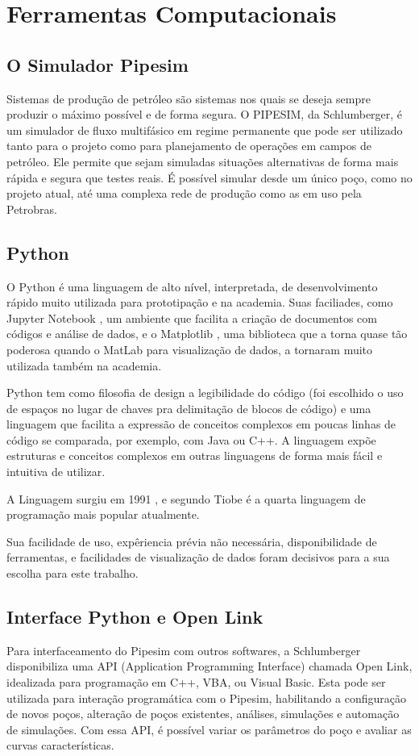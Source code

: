 
\chapter{Ferramentas Computacionais} \label{chap:4}


\section{O Simulador Pipesim}
Sistemas de produção de petróleo são sistemas nos quais se deseja sempre produzir o máximo possível e de forma segura.
O PIPESIM, da Schlumberger, é um simulador de fluxo multifásico em regime permanente que pode ser utilizado tanto para o projeto como para planejamento de operações em campos de petróleo. Ele permite que sejam simuladas situações alternativas de forma mais rápida e segura que testes reais. É possível simular desde um único poço, como no projeto atual, até uma complexa rede de produção como as em uso pela Petrobras.

\section{Python}

O Python é uma linguagem de alto nível, interpretada, de desenvolvimento rápido muito utilizada para prototipação e na academia. Suas faciliades, como Jupyter Notebook \cite{jupyter}, um ambiente que facilita a criação de documentos com códigos e análise de dados, e o Matplotlib \cite{matplotlib}, uma biblioteca que a torna quase tão poderosa quando o MatLab para visualização de dados, a tornaram muito utilizada também na academia.

Python tem como filosofia de design a legibilidade do código (foi escolhido o uso de espaços no lugar de chaves pra delimitação de blocos de código) e uma linguagem que facilita a expressão de conceitos complexos em poucas linhas de código se comparada, por exemplo, com Java ou C++. A linguagem expõe estruturas e conceitos complexos em outras linguagens de forma mais fácil e intuitiva de utilizar.

A Linguagem surgiu em 1991 \cite{pythonHistory}, e segundo Tiobe \cite{tiobe} é a quarta linguagem de programação mais popular atualmente.

Sua facilidade de uso, expêriencia prévia não necessária, disponibilidade de ferramentas, e facilidades de visualização de dados foram decisivos para a sua escolha para este trabalho. 

\section{Interface Python e Open Link}
Para interfaceamento do Pipesim com outros softwares, a Schlumberger disponibiliza uma API (Application Programming Interface) chamada Open Link, idealizada para programação em C++, VBA, ou Visual Basic. Esta pode ser utilizada para interação programática com o Pipesim, habilitando a configuração de novos poços, alteração de poços existentes, análises, simulações e automação de simulações. Com essa API, é possível variar os parâmetros do poço e avaliar as curvas características.




